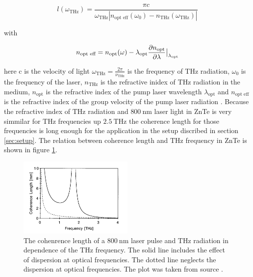 \begin{equation}
    l(\omega_{\si{\tera\hertz}}) = \frac{\pi c}{\omega_{\si{\tera\hertz}} \left | n_\text{opt eff}(\omega_0) - n_{\si{\tera\hertz}}(\omega_{\si{\tera\hertz}})\right |}
\end{equation}

with 

\begin{equation}
    n_{\text{opt eff}} = n_\text{opt}(\omega) - \lambda_\text{opt}\frac{\partial n_\text{opt}}{\partial \lambda}\big{|}_{\lambda_\text{opt}}   
\end{equation}

here c is the velocity of light $\omega_{\si{\tera\hertz}} = \frac{2\pi}{\nu_{\si{\tera\hertz}}}$ is the frequency of $\si{\tera\hertz}$ radiation, $\omega_0$ is the frequency of the laser, $n_{\si{\tera\hertz}}$ is the refractive inidex of $\si{\tera\hertz}$ radiation in the medium, $n_\text{opt}$ is the refractive index of the pump laser wavelength $\lambda_\text{opt}$ and $n_\text{opt eff}$ is the refractive index of the group velocity of the pump laser radiation \cite[3]{coherence_legnth}.
Because the refractive index of $\si{\tera\hertz}$ radiation and $\SI{800}{\nano\meter}$ laser light in ZnTe is very simmilar for $\si{\tera\hertz}$ frequencies up $\SI{2.5}{\tera\hertz}$ \cite{coherence_legnth} the coherence length for those frequencies is long enough for the application in the setup discribed in section \ref{sec:setup}.
The relation between coherence length and $\si{\tera\hertz}$ frequency in ZnTe is shown in figure \ref{fig:coherence_legnth}.

\begin{figure}
    \centering
    \includegraphics[width=0.5\textwidth]{refferenced_pic/coherence_length_ZnTe.png}
    \caption{The cohenrence length of a $\SI{800}{\nano\meter}$ laser pulse and $\si{\tera\hertz}$ radiation in dependence of the $\si{\tera\hertz}$ frequency.
    The solid line includes the effect of dispersion at optical frequencies. The dotted line neglects the dispersion at optical frequencies.
    The plot was taken from source \cite{coherence_legnth}.}
    \label{fig:coherence_legnth}
\end{figure}

